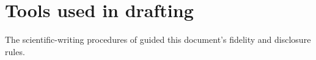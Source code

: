 \documentclass[11pt,a4paper]{article}
\begin{document}
\section*{Tools used in drafting}

The scientific-writing procedures of \citet{kassis2026skills} guided this document's fidelity and disclosure rules.



\end{document}
